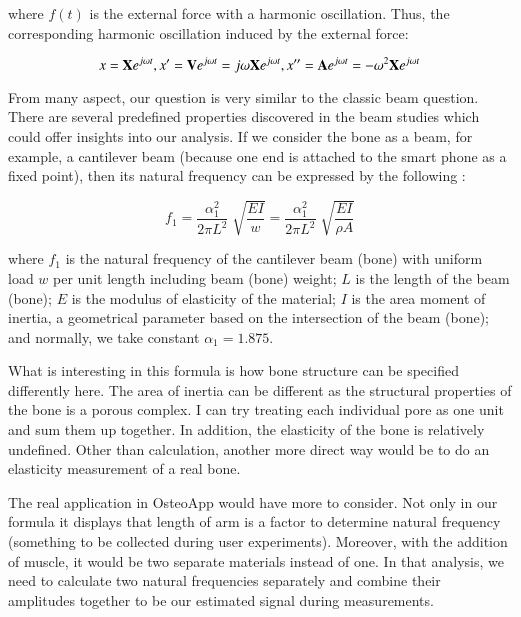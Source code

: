 \documentclass{sigchi}
\begin{document}
where $f(t)$ is the external force with a harmonic oscillation. Thus, the corresponding harmonic oscillation induced by the external force: 

\begin{equation} \label{eq:mot2}
x={\bf X}e^{j\omega t}, x'={\bf V}e^{j \omega t}=j\omega{\bf X}e^{j\omega t}, x''={\bf A}e^{j \omega t}=-\omega^2{\bf X}e^{j \omega t}
\end{equation}

From many aspect, our question is very similar to the classic beam question. There are several predefined properties discovered in the beam studies which could offer insights into our analysis. If we consider the bone as a beam, for example, a cantilever beam (because one end is attached to the smart phone as a fixed point), then its natural frequency can be expressed by the following \cite{Young:2002:formula}:

\begin{equation} \label{eq:beam}
f_1=\frac{\alpha_1^2}{2\pi L^2}\sqrt[]{\frac{EI}{w}}=\frac{\alpha_1^2}{2\pi L^2}\sqrt[]{\frac{EI}{\rho A}}
\end{equation}

where $f_1$ is the natural frequency of the cantilever beam (bone) with uniform load $w$ per unit length including beam (bone) weight; $L$ is the length of the beam (bone); $E$ is the modulus of elasticity of the material; $I$ is the area moment of inertia, a geometrical parameter based on the intersection of the beam (bone); and normally, we take constant $\alpha_1 = 1.875$.

What is interesting in this formula is how bone structure can be specified differently here. The area of inertia can be different as the structural properties of the bone is a porous complex. I can try treating each individual pore as one unit and sum them up together. In addition, the elasticity of the bone is relatively undefined. Other than calculation, another more direct way would be to do an elasticity measurement of a real bone. 
 
The real application in OsteoApp would have more to consider. Not only in our formula it displays that length of arm is a factor to determine natural frequency (something to be collected during user experiments). Moreover, with the addition of muscle, it would be two separate materials instead of one. In that analysis, we need to calculate two natural frequencies separately and combine their amplitudes together to be our estimated signal during measurements. 
\end{document}
